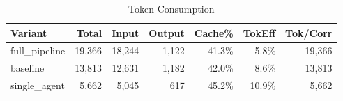 \begin{table}[htbp]
\centering
\caption{Token Consumption}
\label{tab:tokens}
\begin{tabular}{l rrrr rr}
\toprule
Variant & Total & Input & Output & Cache\% & TokEff & Tok/Corr \\
\midrule
  full\_pipeline & 19,366 & 18,244 & 1,122 & 41.3\% & 5.8\% & 19,366 \\
  baseline & 13,813 & 12,631 & 1,182 & 42.0\% & 8.6\% & 13,813 \\
  single\_agent & 5,662 & 5,045 & 617 & 45.2\% & 10.9\% & 5,662 \\
\bottomrule
\end{tabular}
\end{table}
